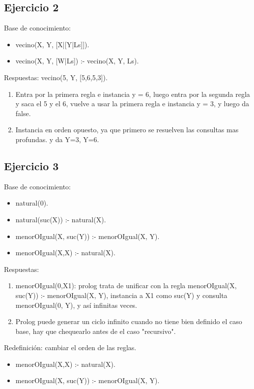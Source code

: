 \documentclass[10pt,a4paper]{article}
\begin{document}
\subsection{Ejercicio 2}
Base de conocimiento:
\begin{itemize}
\item vecino(X, Y, [X|[Y|Ls]]).
\item vecino(X, Y, [W|Ls]) :- vecino(X, Y, Ls).
\end{itemize}
Respuestas: vecino(5, Y, [5,6,5,3]).
\begin{enumerate}
\item Entra por la primera regla e instancia y = 6, luego entra por la segunda regla y saca el 5 y el 6, vuelve a usar la primera regla e instancia y = 3, y luego da false.
\item Instancia en orden opuesto, ya que primero se resuelven las consultas mas profundas. y da Y=3, Y=6.
\end{enumerate}

\subsection{Ejercicio 3}
    Base de conocimiento:
    \begin{itemize}
        \item natural(0).
        \item natural(suc(X)) :- natural(X).
        \item menorOIgual(X, suc(Y)) :- menorOIgual(X, Y).
        \item menorOIgual(X,X) :- natural(X).
    \end{itemize}
    
    Respuestas:
    \begin{enumerate}
        \item menorOIgual(0,X1): prolog trata de unificar con la regla menorOIgual(X, suc(Y)) :- menorOIgual(X, Y), instancia a X1 como suc(Y) y consulta menorOIgual(0, Y), y así infinitas veces.
        \item Prolog puede generar un ciclo infinito cuando no tiene bien definido el caso base, hay que chequearlo antes de el caso "recursivo".
    \end{enumerate}
    
    Redefinición: cambiar el orden de las reglas.
    \begin{itemize}
        \item menorOIgual(X,X) :- natural(X).
        \item menorOIgual(X, suc(Y)) :- menorOIgual(X, Y).
    \end{itemize}
\end{document}
